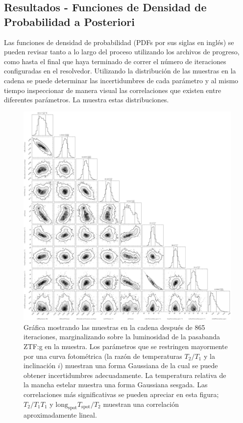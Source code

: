 \subsection{Resultados - Funciones de Densidad de Probabilidad a Posteriori}

Las funciones de densidad de probabilidad (PDFs por sus siglas en inglés) se
pueden revisar tanto a lo largo del proceso utilizando los archivos de progreso,
como hasta el final que haya terminado de correr el número de iteraciones
configuradas en el resolvedor. Utilizando la distribución de las muestras en la
cadena se puede determinar las incertidumbres de cada parámetro y al mismo
tiempo inspeccionar de manera visual las correlaciones que existen entre
diferentes parámetros. La  muestra
estas distribuciones.

\begin{figure}[!ht]
	\centering
	\includegraphics[scale=0.32]{Metodologia/Secciones/ModeloComputacional/Figures/Figura MCMC ZTF Resultados.png}
	\caption{Gráfica mostrando las muestras en la cadena después de 865
	iteraciones, marginalizando sobre la luminosidad de la pasabanda ZTF:g en la
	muestra. Los parámetros que se restringen mayormente por una curva
	fotométrica (la razón de temperaturas $T_2/T_1$ y la inclinación $i$)
	muestran una forma Gaussiana de la cual se puede obtener incertidumbres
	adecuadamente. La temperatura relativa de la mancha estelar 
	muestra una forma Gaussiana sesgada. Las correlaciones más significativas se
	pueden apreciar en esta figura; $T_2/T_1$\textemdash $T_1$ y
	$\mathrm{long}_{\mathrm{spot}}$\textemdash $T_{\mathrm{spot}}/T_2$ muestran
	una correlación aproximadamente lineal.}
	\label{figuraMcmcZtfResultadosPrimarios}
\end{figure}

